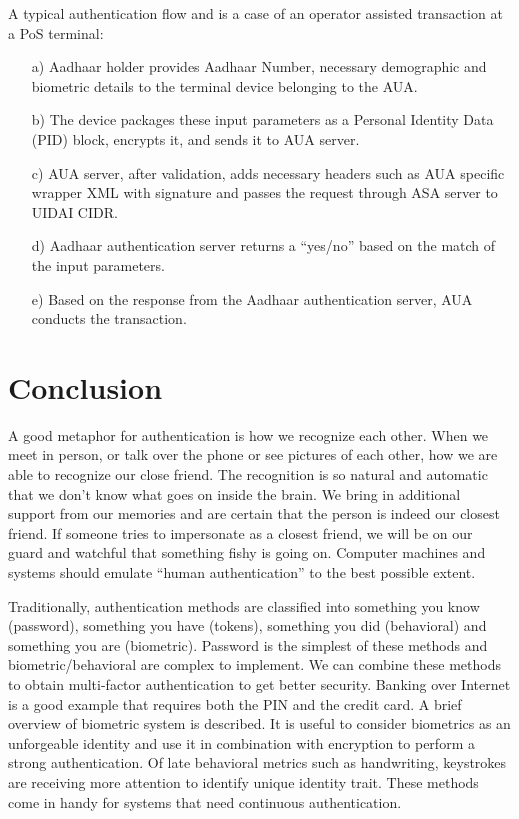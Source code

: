 \begin{multicols}{2}
A typical authentication flow and is a case of an operator assisted transaction at a PoS terminal:
\begin{itemize}
\item[a)] Aadhaar holder provides Aadhaar Number, necessary demographic and biometric details to the terminal device belonging to the AUA.
\item[b)] The device packages these input parameters as a Personal Identity Data (PID) block, encrypts it, and sends it to AUA server.	
\item[c)] AUA server, after validation, adds necessary headers such as AUA specific wrapper XML with signature and passes the request through ASA server to UIDAI CIDR.	
\item[d)] Aadhaar authentication server returns a ``yes/no'' based on the match of the input parameters.
\item[e)] Based on the response from the Aadhaar authentication server, AUA conducts the transaction.
\end{itemize}

\section{Conclusion}

A good metaphor for authentication is how we recognize each other. When we meet in person, or talk over the phone or see pictures of each other, how we are able to recognize our close friend. The recognition is so natural and automatic that we don't know what goes on inside the brain. We bring in additional support from our memories and are certain that the person is indeed our closest friend. If someone tries to impersonate as a closest friend, we will be on our guard and watchful that something fishy is going on. Computer machines and systems should emulate ``human authentication'' to the best possible extent.

Traditionally, authentication methods are classified into something you know (password), something you have (tokens), something you did (behavioral) and something you are (biometric). Password is the simplest of these methods and biometric/behavioral are complex to implement. We can combine these methods to obtain multi-factor authentication to get better security. Banking over Internet is a good example that requires both the PIN and the credit card. A brief overview of biometric system is described. It is useful to consider biometrics as an unforgeable identity and use it in combination with encryption to perform a strong authentication. Of late behavioral metrics such as handwriting, keystrokes are receiving more attention to identify unique identity trait. These methods come in handy for systems that need continuous authentication.


\end{multicols}
